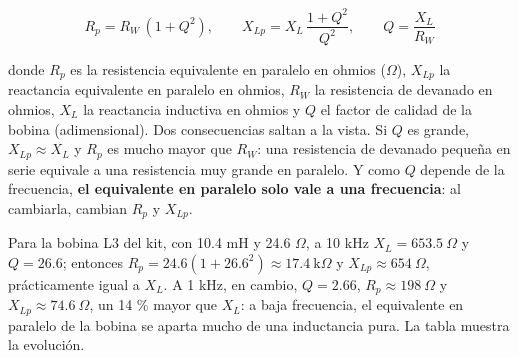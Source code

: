 \documentclass[11pt,letterpaper]{article}
\begin{document}
\begin{equation}
  R_p = R_W\,(1 + Q^{2}), \qquad X_{Lp} = X_L\,\frac{1 + Q^{2}}{Q^{2}}, \qquad Q = \frac{X_L}{R_W}
\end{equation}

donde $R_p$ es la resistencia equivalente en paralelo en ohmios (\ensuremath{\Omega}), $X_{Lp}$ la reactancia equivalente en paralelo en ohmios, $R_W$ la resistencia de devanado en ohmios, $X_L$ la reactancia inductiva en ohmios y $Q$ el factor de calidad de la bobina (adimensional). Dos consecuencias saltan a la vista. Si $Q$ es grande, $X_{Lp} \approx X_L$ y $R_p$ es mucho mayor que $R_W$: una resistencia de devanado pequeña en serie equivale a una resistencia muy grande en paralelo. Y como $Q$ depende de la frecuencia, \textbf{el equivalente en paralelo solo vale a una frecuencia}: al cambiarla, cambian $R_p$ y $X_{Lp}$.

Para la bobina L3 del kit, con 10.4 mH y 24.6 \ensuremath{\Omega}, a 10 kHz $X_L = 653.5\ \Omega$ y $Q = 26.6$; entonces $R_p = 24.6(1 + 26.6^2) \approx 17.4\ \text{k}\Omega$ y $X_{Lp} \approx 654\ \Omega$, prácticamente igual a $X_L$. A 1 kHz, en cambio, $Q = 2.66$, $R_p \approx 198\ \Omega$ y $X_{Lp} \approx 74.6\ \Omega$, un 14 \% mayor que $X_L$: a baja frecuencia, el equivalente en paralelo de la bobina se aparta mucho de una inductancia pura. La tabla muestra la evolución.
\end{document}
